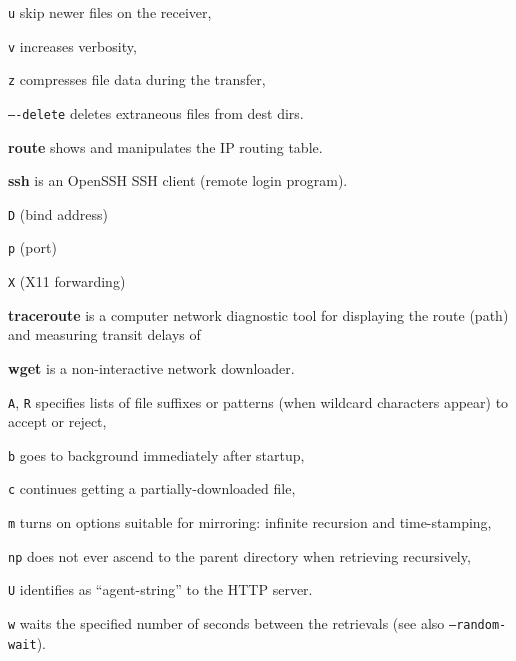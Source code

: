 \begin{enumx}
\item [\texttt{u}] skip newer files on the receiver, 
\item [\texttt{v}] increases verbosity, 
\item [\texttt{z}] compresses file data during the transfer,
\item [\texttt{}] \texttt{----delete} deletes extraneous files from dest dirs.
\item [\cmd] \textbf{route} shows and manipulates the IP routing table.
\item [\cmd] \textbf{ssh} is an OpenSSH SSH client (remote login program).
\item [\texttt{D}] (bind address)
\item [\texttt{p}] (port)
\item [\texttt{X}] (X11 forwarding)
\item [\cmd] \textbf{traceroute} is a computer network diagnostic tool for 
displaying the route (path) and measuring transit delays of 
\item [\cmd] \textbf{wget} is a non-interactive network downloader.
\item [\texttt{A}, \texttt{R}] specifies lists 	of file suffixes or 
	patterns (when wildcard characters appear) to accept or reject,
\item [\texttt{b}] goes to background immediately after startup,
\item [\texttt{c}] continues getting a partially-downloaded file,
\item [\texttt{m}] turns on options suitable for mirroring: 
	infinite recursion and time-stamping,
\item [\texttt{np}] does not ever ascend to the
	parent directory when retrieving recursively,
\item [\texttt{U}] identifies as ``agent-string'' to the HTTP server.
\item [\texttt{w}] waits the specified number of seconds 
	between the retrievals (see also \texttt{--random-wait}).
\end{enumx}
